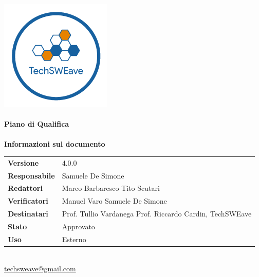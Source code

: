 \documentclass[a4paper]{article}
\begin{document}
\begin{titlepage}
    \begin{center}
        \includegraphics{../../../Images/logo}\\
        \vspace{20px}
        \textcolor{logo}{\hrulefill}\\
        \vspace{20px}
        \textbf{\huge\textcolor{logo}{Piano di Qualifica}}\\
        \vspace{10px}
        \textcolor{logo}{\hrulefill}\\
        \vspace{40px}
        \textbf{\Large Informazioni sul documento}\\
        \vspace{20px}
        \begin{tabular}{p{100px} | p{100px}}
            \textbf{Versione}     & 4.0.0                                                                      \\
            \textbf{Responsabile} & Samuele De Simone                                                          \\
            \textbf{Redattori}    & Marco Barbaresco \newline Tito Scutari                                     \\
            \textbf{Verificatori} & Manuel Varo \newline Samuele De Simone                                     \\
            \textbf{Destinatari}  & Prof. Tullio Vardanega \newline Prof. Riccardo Cardin, \newline TechSWEave \\
            \textbf{Stato}        & Approvato                                                                  \\
            \textbf{Uso}          & Esterno                                                                    \\
        \end{tabular}\\
        \vspace{60px}
        \href{mailto:techsweave@gmail.com}{techsweave@gmail.com}\\

    \end{center}
\end{titlepage}
\end{document}
